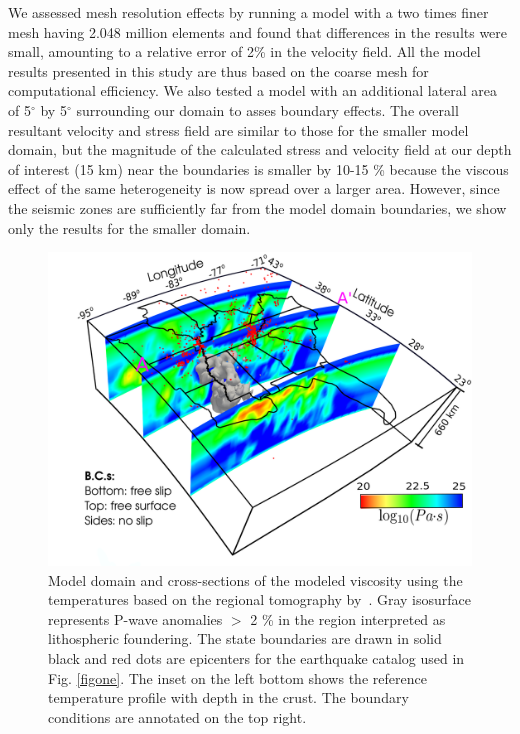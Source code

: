\documentclass[draft,linenumbers]{agujournal2018}
\begin{document}
We assessed mesh resolution effects by running a model with a two times finer mesh having 2.048 million elements and found that differences in the results were small, amounting to a relative error of 2\% in the velocity field. All the model results presented in this study are thus based on the coarse mesh for computational efficiency. We also tested a model with an additional lateral area of 5$^{\circ}$ by 5$^{\circ}$ surrounding our domain to asses boundary effects. The overall resultant velocity and stress field are similar to those for the smaller model domain, but the magnitude of the calculated stress and velocity field at our depth of interest (15 km) near the boundaries is smaller by 10-15 \% because the viscous effect of the same heterogeneity is now spread over a larger area. However, since the seismic zones are sufficiently far from the model domain boundaries, we show only the results for the smaller domain.
%
\begin{figure}[ht]
    \centering
    \includegraphics[width=0.75\linewidth]{figures/model_figure.png}
    \caption{Model domain and cross-sections of the modeled viscosity using the temperatures based on the regional tomography by~\citet{Biryol_2016}. Gray isosurface represents P-wave anomalies $>$ 2 \% in the region interpreted as lithospheric foundering. 
The state boundaries are drawn in solid black and red dots are epicenters for the earthquake catalog used in Fig. \ref{figone}. The inset on the left bottom shows the reference temperature profile with depth in the crust. The boundary conditions are annotated on the top right.}
    \label{fig_model}
\end{figure}
\end{document}
